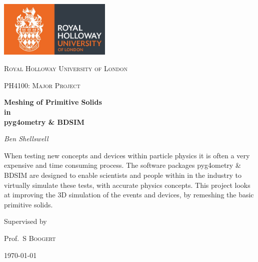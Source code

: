 \documentclass[12pt,a4paper]{article}
\begin{document}
\begin{titlepage}
	\centering
	\includegraphics[width=0.4\textwidth]{Images//Logos//rhul.jpg}\par\vspace{1cm}


	{\scshape\LARGE Royal Holloway University of London \par}
	\vspace{1cm}
	{\scshape\Large PH4100: Major Project\par}
	\vspace{1.5cm}
	{\huge\bfseries Meshing of Primitive Solids\\
	in\\
	pyg4ometry \& BDSIM\par}
	\vspace{2cm}
	{\Large\itshape Ben Shellswell\par}
	\vfill

\begin{abstract}
\centering

\end{abstract}
When testing new concepts and devices within particle physics it is often a very expensive and time consuming process. The software packages pyg4ometry \& BDSIM are designed to enable scientists and people within in the industry to virtually simulate these tests, with accurate physics concepts. This project looks at improving the 3D simulation of the events and devices, by remeshing the basic primitive solids.

	\vfill
	
	Supervised by\par
	Prof.~S \textsc{Boogert} 

	{\large \today\par}




\end{titlepage}
\end{document}
